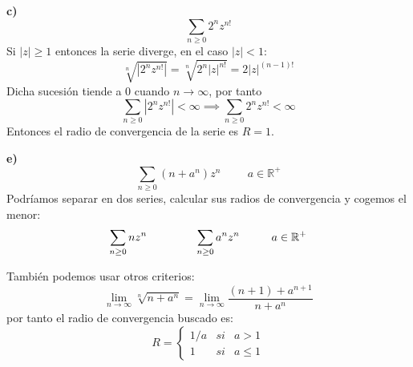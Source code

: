 \begin{sol}


\textbf{c)}
$$\sum_{n\geq 0} 2^nz^{n!}$$
Si $|z|\geq 1$ entonces la serie diverge, en el caso $|z|<1$:
$$\sqrt[n]{|2^nz^{n!}|} = \sqrt[n]{2^n|z|^{n!}} = 2|z|^{(n-1)!}$$
Dicha sucesión tiende a $0$ cuando $n\rightarrow\infty$, por tanto %
$$\sum_{n\geq 0} |2^nz^{n!}| < \infty \implies \sum_{n\geq 0} 2^nz^{n!} < \infty$$ 
Entonces el radio de convergencia de la serie es $R=1$.



\textbf{e)}
$$\sum_{n\geq 0} (n+a^n)z^n \hspace{1cm} a\in\mathbb{R}^+$$
Podríamos separar en dos series, calcular sus radios de convergencia y cogemos el menor:
$$\sum_{n\geq 0} nz^n \hspace{1.5cm}\sum_{n\geq 0} a^nz^n\hspace{1cm} a\in\mathbb{R}^+$$
\begin{comment}
Observamos que $a^n \leq n+a^n \leq (n+1)a^n$,
en los extremos el radio de convergencia es $1/a$, por tanto el radio de convergencia de $n+a^n$ es $1/a$
$$\sum_{n\geq 0} a^n |z|^n \leq \sum_{n\geq 0} (n+a^n)|z|^n \leq \sum_{n\geq 0} (n+1)a^n|z|^n$$
Por tanto el radio de convergencia es $1/a$.
\end{comment}

También podemos usar otros criterios:
$$\lim_{n\rightarrow\infty} \sqrt[n]{n+a^n} = \lim_{n\rightarrow\infty} \frac{(n+1)+a^{n+1}}{n+a^n} $$
por tanto el radio de convergencia buscado es:
$$ R = \left\{ \begin{array}{lcc}
1/a &   si  & a>1 \\
1 &  si & a\leq 1
\end{array}
\right. $$


\begin{comment}
\textbf{f)}
$\sum_{n\geq 0} a^{n^2}z^n,a\in\mathbb{C}$
raíz n-esima 
\end{comment}

\end{sol}

